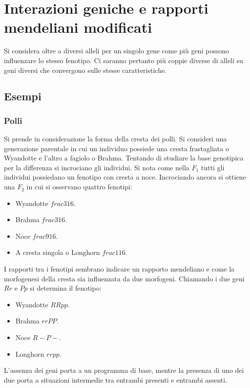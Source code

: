 \section{Interazioni geniche e rapporti mendeliani modificati}
Si considera oltre a diversi alleli per un singolo gene come pi\`u geni possono influenzare lo stesso fenotipo. Ci saranno pertanto pi\`u coppie diverse di alleli su geni diversi che
convergono sulle stesse caratteristiche. 
\subsection{Esempi}
\subsubsection{Polli}
Si prende in considerazione la forma della cresta dei polli. Si consideri una generazione parentale in cui un individuo possiede una cresta frastagliata o Wyandotte e l'altro a fagiolo
o Brahma. Tentando di studiare la base genotipica per la differenza si incrociano gli individui. Si nota come nella $F_1$ tutti gli individui possiedano un fenotipo con cresta a noce. 
Incrociando ancora si ottiene una $F_2$ in cui si osservano quattro fenotipi:
\begin{itemize}
	\item Wyandotte $frac{3}{16}$.
	\item Brahma $frac{3}{16}$.
	\item Noce $frac{9}{16}$.
	\item A cresta singola o Longhorn $frac{1}{16}$.
\end{itemize}
I rapporti tra i fenotipi sembrano indicare un rapporto mendeliano e come la morfogenesi della cresta sia influenzata da due morfogeni. Chiamando i due geni $Rr$ e $Pp$ si determina il
fenotipo:
\begin{itemize}
	\item Wyandotte $RRpp$.
	\item Brahma $rrPP$.
	\item Noce $R-P-$.
	\item Longhorn $rrpp$.
\end{itemize}
L'assenza dei geni porta a un programma di base, mentre la presenza di uno dei due porta a situazioni intermedie tra entrambi presenti e entrambi assenti. 
